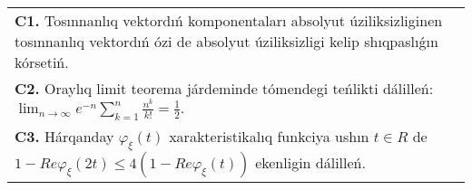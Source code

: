 \documentclass{article}
\begin{document}
\begin{tabular}{m{17cm}}
 \\
\textbf{C1.} Tosınnanlıq vektordıń komponentaları absolyut úziliksizliginen tosınnanlıq vektordıń ózi de absolyut úziliksizligi kelip shıqpaslıǵın kórsetiń.
 \\
\textbf{C2.} Oraylıq limit teorema járdeminde tómendegi teńlikti dálilleń: \(\lim_{n \rightarrow \infty}e^{- n}\sum_{k = 1}^{n}\frac{n^{k}}{k!} = \frac{1}{2}.\)
 \\
\textbf{C3.} Hárqanday \(\varphi_{\xi}(t)\) xarakteristikalıq funkciya ushın \(t \in R\) de \(1 - Re\varphi_{\xi}(2t) \leq 4\left( 1 - Re\varphi_{\xi}(t) \right)\) ekenligin dálilleń.
 \\

\end{tabular}
\vspace{1cm}
\end{document}

